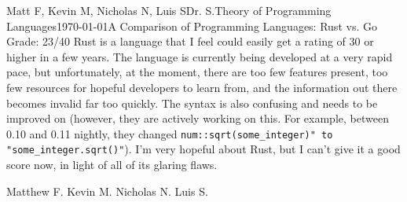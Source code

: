 \documentclass[12pt,letterpaper]{article}
\begin{document}
\begin{mla}{Matt F, Kevin M, Nicholas N, Luis S}{}{Dr. S.}{Theory of Programming Languages}{\today}{A Comparison of Programming Languages: Rust vs. Go}
Grade: 23/40
	Rust is a language that I feel could easily get a rating of 30 or higher in a few years. The language is currently being developed at a very rapid pace, but unfortunately, at the moment, there are too few features present, too few resources for hopeful developers to learn from, and the information out there becomes invalid far too quickly. The syntax is also confusing and needs to be improved on (however, they are actively working on this. For example, between 0.10 and 0.11 nightly, they changed \texttt{num::sqrt(some\_integer)" to "some\_integer.sqrt()"}). I'm very hopeful about Rust, but I can't give it a good score now, in light of all of its glaring flaws.


Matthew F.
Kevin M.
Nicholas N.
Luis S.

\end{mla}
\end{document}
